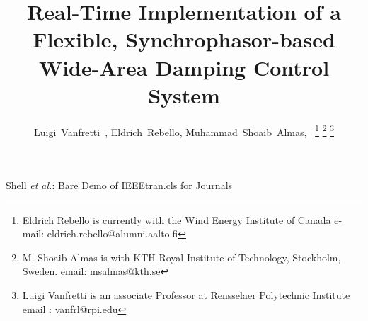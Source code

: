 \documentclass[journal]{IEEEtran}
\begin{document}
%
\title{Real-Time Implementation of a Flexible, Synchrophasor-based Wide-Area Damping Control System}
%
%
%


\author{Luigi~Vanfretti~, Eldrich~Rebello,
        Muhammad~Shoaib~Almas,~
\thanks{Eldrich Rebello is currently with the Wind Energy Institute of Canada
e-mail:  \mbox{eldrich.rebello@alumni.aalto.fi}}%
\thanks{M. Shoaib Almas is with KTH Royal Institute of Technology, Stockholm, Sweden. email: msalmas@kth.se}%
\thanks{Luigi Vanfretti is an associate Professor at Rensselaer Polytechnic Institute  email : vanfrl@rpi.edu}}

% 
%



%
{Shell \MakeLowercase{\textit{et al.}}: Bare Demo of IEEEtran.cls for Journals}
% 
\end{document}
